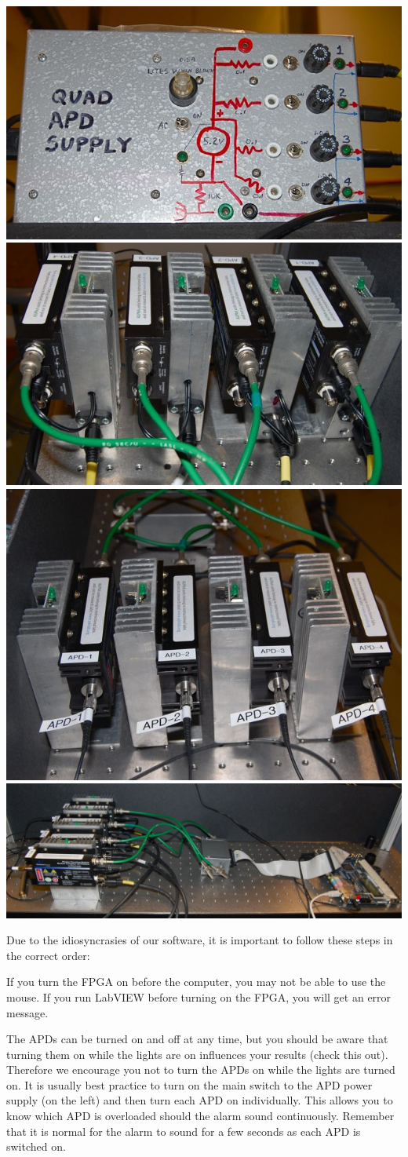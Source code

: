 \documentclass{../lab}
\begin{document}
\noindent
\href{http://experimentationlab.berkeley.edu/sites/default/files/images/QIE1.jpg}{\includegraphics[width=0.25\linewidth,keepaspectratio]{images/QIE1.jpg}}
\href{http://experimentationlab.berkeley.edu/sites/default/files/images/QIE4.jpg}{\includegraphics[width=0.25\linewidth,keepaspectratio]{images/QIE4.jpg}}
\href{http://experimentationlab.berkeley.edu/sites/default/files/images/QIE3.jpg}{\includegraphics[width=0.25\linewidth,keepaspectratio]{images/QIE3.jpg}}
\href{http://experimentationlab.berkeley.edu/sites/default/files/images/QIE2.jpg}{\includegraphics[width=0.25\linewidth,keepaspectratio]{images/QIE2.jpg}}

\noindent Due to the idiosyncrasies of our software, it is important to follow these steps in the correct order:


If you turn the FPGA on before the computer, you may not be able to use the mouse. If you run LabVIEW before turning on the FPGA, you will get an error message.

The APDs can be turned on and off at any time, but you should be aware that turning them on while the lights are on influences your results (check this out). Therefore we encourage you not to turn the APDs on while the lights are turned on. It is usually best practice to turn on the main switch to the APD power supply (on the left) and then turn each APD on individually. This allows you to know which APD is overloaded should the alarm sound continuously. Remember that it is normal for the alarm to sound for a few seconds as each APD is switched on.
\end{document}
